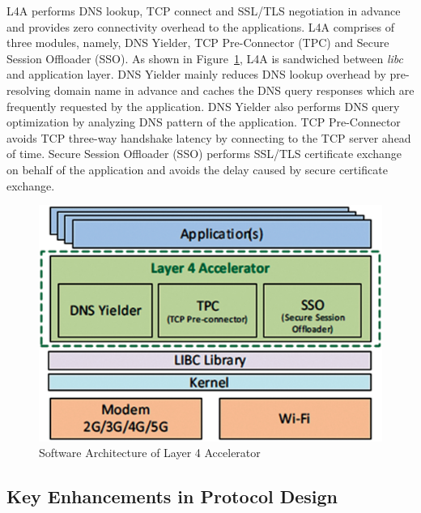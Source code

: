 \begin{multicols}{2}
L4A performs DNS lookup, TCP connect and SSL/TLS negotiation in advance and provides zero connectivity overhead to the applications. L4A comprises of three modules, namely, DNS Yielder, TCP Pre-Connector (TPC) and Secure Session Offloader (SSO). As shown in Figure~\ref{chap1-fig07}, L4A is sandwiched between \textit{libc} and application layer. DNS Yielder mainly reduces DNS lookup overhead by pre-resolving domain name in advance and caches the DNS query responses which are frequently requested by the application. DNS Yielder also performs DNS query optimization by analyzing DNS pattern of the application. TCP Pre-Connector avoids TCP three-way handshake latency by connecting to the TCP server ahead of time. Secure Session Offloader (SSO) performs SSL/TLS certificate exchange on behalf of the application and avoids the delay caused by secure certificate exchange.

\begin{figure}[H]
\centering
\includegraphics[scale=.9]{src/Figures/chap1/chap1-fig07.jpg}
\caption{Software Architecture of Layer 4 Accelerator}\label{chap1-fig07}
\end{figure}

\subsection{Key Enhancements in Protocol Design}


\end{multicols}
